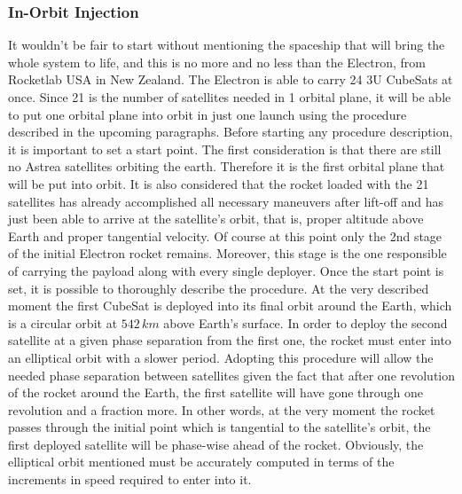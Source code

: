 \subsubsection{In-Orbit Injection}
It wouldn't be fair to start without mentioning the spaceship that will bring the whole system to life, and this is no more and no less than the Electron, from Rocketlab USA in New Zealand. The Electron is able to carry 24 3U CubeSats at once. Since 21 is the number of satellites needed in 1 orbital plane, it will be able to put one orbital plane into orbit in just one launch using the procedure described in the upcoming paragraphs.
\newline\newline
Before starting any procedure description, it is important to set a start point. The first consideration is that there are still no Astrea satellites orbiting the earth. Therefore it is the first orbital plane that will be put into orbit. It is also considered that the rocket loaded with the 21 satellites has already accomplished all necessary maneuvers after lift-off and has just been able to arrive at the satellite's orbit, that is, proper altitude above Earth and proper tangential velocity. Of course at this point only the 2nd stage of the initial Electron rocket remains. Moreover, this stage is the one responsible of carrying the payload along with every single deployer. Once the start point is set, it is possible to thoroughly describe the procedure.
\newline\newline
At the very described moment the first CubeSat is deployed into its final orbit around the Earth, which is a circular orbit at $542 \,km$ above Earth's surface. In order to deploy the second satellite at a given phase separation from the first one, the rocket must enter into an elliptical orbit with a slower period. Adopting this procedure will allow the needed phase separation between satellites given the fact that after one revolution of the rocket around the Earth, the first satellite will have gone through one revolution and a fraction more. In other words, at the very moment the rocket passes through the initial point which is tangential to the satellite's orbit, the first deployed satellite will be phase-wise ahead of the rocket. Obviously, the elliptical orbit mentioned must be accurately computed in terms of the increments in speed required to enter into it.
\newline\newline

